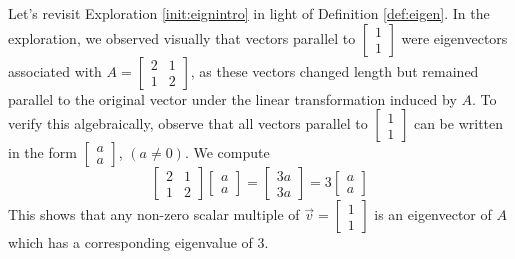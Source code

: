 \documentclass{ximera}
\begin{document}
Let's revisit Exploration \ref{init:eignintro} in light of Definition \ref{def:eigen}.  In the exploration, we observed visually that vectors parallel to $\begin{bmatrix} 1\\ 1 \end{bmatrix}$ were eigenvectors associated with $A=\begin{bmatrix} 2& 1\\ 1&2
\end{bmatrix}$, as these vectors changed length but remained parallel to the original vector under the linear transformation induced by $A$.  To verify this algebraically, observe that all vectors parallel to $\begin{bmatrix} 1\\ 1 \end{bmatrix}$ can be written in the form $\begin{bmatrix} a\\ a \end{bmatrix}$, $(a\neq 0)$.  We compute
$$\begin{bmatrix} 2& 1\\ 1&2 \end{bmatrix} \begin{bmatrix} a\\ a \end{bmatrix} =
\begin{bmatrix} 3a\\ 3a \end{bmatrix}= 3 \begin{bmatrix} a\\ a \end{bmatrix}$$
This shows that any non-zero scalar multiple of $\vec{v}=\begin{bmatrix} 1\\ 1 \end{bmatrix}$ is an eigenvector of $A$ which has a corresponding eigenvalue of 3.
    
\begin{center}
\end{center}
    
\end{document}
